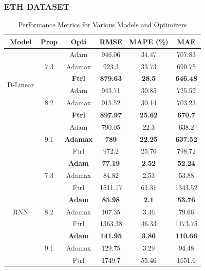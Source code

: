 \documentclass{ieeeojies}
\begin{document}
\subsubsection{ETH DATASET}
\begin{table}[H]
    \centering
    \caption{Performance Metrics for Various Models and Optimizers}
    \begin{tabular}{|c|c|c|c|c|c|}
        \hline
        \rowcolor{ao(english)}
        Model & Prop & Opti & RMSE & MAPE (\%) & MAE \\ \hline

        \multirow{6}{*}{D-Linear} & \multirow{3}{*}{7:3} & Adam & 946.06 & 34.47 & 707.83 \\ \cline{3-6}
        & & Adamax & 923.3 & 33.73 & 690.75 \\ \cline{3-6}
        & & \textbf{Ftrl} & \textbf{879.63} & \textbf{28.5} & \textbf{646.48} \\ \cline{2-6}
        & \multirow{3}{*}{8:2} & Adam & 943.71 & 30.85 & 725.52 \\ \cline{3-6}
        & & Adamax & 915.52 & 30.14 & 703.23 \\ \cline{3-6}
        & & \textbf{Ftrl} & \textbf{897.97} & \textbf{25.62} & \textbf{670.7} \\ \cline{2-6}
        & \multirow{3}{*}{9:1} & Adam & 790.05 & 22.3 & 638.2 \\ \cline{3-6}
        & & \textbf{Adamax} & \textbf{789} & \textbf{22.25} & \textbf{637.52} \\ \cline{3-6}
        & & Ftrl & 972.2 & 25.76 & 798.72 \\ \hline
        
        \multirow{9}{*}{RNN} & \multirow{3}{*}{7:3} & \textbf{Adam} & \textbf{77.19} & \textbf{2.52} & \textbf{52.24}
        \\ \cline{3-6}
        & & Adamax & 84.82 & 2.53 & 53.88 \\ \cline{3-6}
        & & Ftrl & 1511.17 & 61.31 & 1343.52 \\ \cline{2-6}
        & \multirow{3}{*}{8:2} & \textbf{Adam} & \textbf{85.98} & \textbf{2.1} & \textbf{53.76} \\ \cline{3-6}
        & & Adamax & 107.35 & 3.46 & 79.66 \\ \cline{3-6}
        & & Ftrl & 1363.38 & 46.33 & 1173.75 \\ \cline{2-6}
        & \multirow{3}{*}{9:1} & \textbf{Adam} & \textbf{141.95} & \textbf{3.86} & \textbf{110.66} \\ \cline{3-6}
        & & Adamax & 129.75 & 3.29 & 94.48 \\ \cline{3-6}
        & & Ftrl & 1749.7 & 55.46 & 1651.6 \\ \hline
        

\end{tabular}
\end{table}
\end{document}
